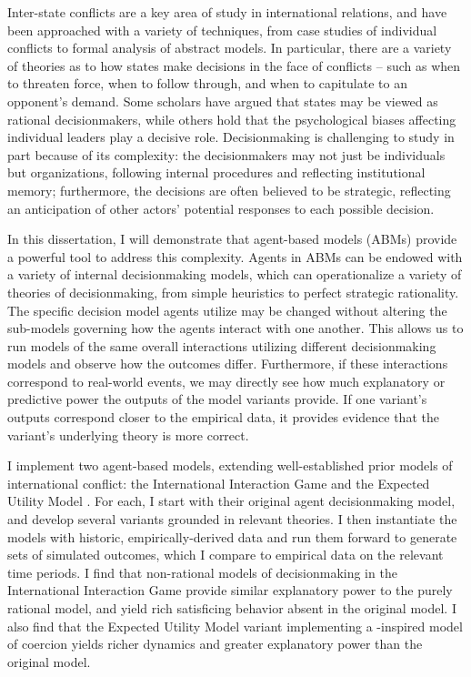 
Inter-state conflicts are a key area of study in international relations, and have been approached with a variety of techniques, from case studies of individual conflicts to formal analysis of abstract models. In particular, there are a variety of theories as to how states make decisions in the face of conflicts -- such as when to threaten force, when to follow through, and when to capitulate to an opponent's demand. Some scholars have argued that states may be viewed as rational decisionmakers, while others hold that the psychological biases affecting individual leaders play a decisive role. Decisionmaking is challenging to study in part because of its complexity: the decisionmakers may not just be individuals but organizations, following internal procedures and reflecting institutional memory; furthermore, the decisions are often believed to be strategic, reflecting an anticipation of other actors' potential responses to each possible decision.

In this dissertation, I will demonstrate that agent-based models (ABMs) provide a powerful tool to address this complexity. Agents in ABMs can be endowed with a variety of internal decisionmaking models, which can operationalize a variety of theories of decisionmaking, from simple heuristics to perfect strategic rationality. The specific decision model agents utilize may be changed without altering the sub-models governing how the agents interact with one another. This allows us to run models of the same overall interactions utilizing different decisionmaking models and observe how the outcomes differ. Furthermore, if these interactions correspond to real-world events, we may directly see how much explanatory or predictive power the outputs of the model variants provide. If one variant's outputs correspond closer to the empirical data, it provides evidence that the variant's underlying theory is more correct.

I implement two agent-based models, extending well-established prior models of international conflict: the International Interaction Game \citep{bdm_1992} and the Expected Utility Model \citep{bdm_2002}. For each, I start with their original agent decisionmaking model, and develop several variants grounded in relevant theories. I then instantiate the models with historic, empirically-derived data and run them forward to generate sets of simulated outcomes, which I compare to empirical data on the relevant time periods. I find that non-rational models of decisionmaking in the International Interaction Game provide similar explanatory power to the purely rational model, and yield rich satisficing behavior absent in the original model. I also find that the Expected Utility Model variant implementing a \citet{schelling_1966}-inspired model of coercion yields richer dynamics and greater explanatory power than the original model. 
